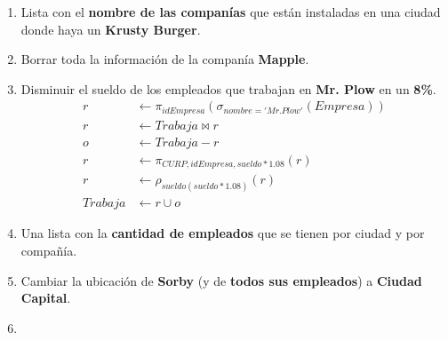 \documentclass{article}
\begin{document}
\begin{enumerate}
{{\begin{enumerate}
{                        más que cualquier empleado \textbf{FSA}.
                        \begin{align*}
                            r &\leftarrow \pi_{idEmpresa}(\sigma_{nombre = 'FSA'}(Empresa)) \\
                            m &\leftarrow Max_{sueldo}(Trabaja \bowtie r) \\
                            e &\leftarrow \pi_{CURP}(\sigma_{sueldo>m}(Trabaja))
                        \end{align*}
                    }
                    \item {
                        Lista con el \textbf{nombre de las companías} que están
                        instaladas en una ciudad donde haya un
                        \textbf{Krusty Burger}.
                    }
                    \item {
                        Borrar toda la información de la companía
                        \textbf{Mapple}.
                    }
                    \item {
                        Disminuir el sueldo de los empleados que trabajan en
                        \textbf{Mr. Plow} en un \textbf{8\%}.
                        \begin{align*}
                            r &\leftarrow \pi_{idEmpresa}(\sigma_{nombre = 'Mr. Plow'}(Empresa)) \\
                            r &\leftarrow Trabaja \bowtie r \\
                            o &\leftarrow Trabaja - r \\
                            r &\leftarrow \pi_{CURP, idEmpresa, sueldo*1.08}(r)\\
                            r &\leftarrow \rho_{sueldo(sueldo*1.08)}(r)\\
                            Trabaja &\leftarrow r \cup o
                        \end{align*}
                    }
                    \item {
                        Una lista con la \textbf{cantidad de empleados} que se
                        tienen por ciudad y por compañía.
                    }
                    \item {
                        Cambiar la ubicación de \textbf{Sorby} (y de 
                        \textbf{todos sus empleados}) a \textbf{Ciudad Capital}.
                    }
                    \item {
}
\end{enumerate}}}
\end{enumerate}
\end{document}
